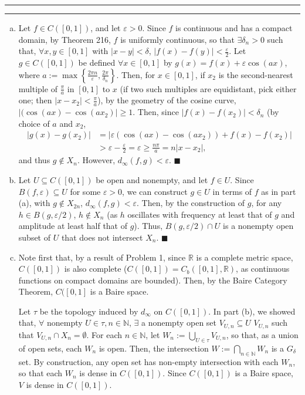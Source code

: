 \documentclass[11pt]{article}
\newcounter{questionCounter}
\newcounter{partCounter}[questionCounter]
\newenvironment{question}[2][\arabic{questionCounter}]{%
    \setcounter{partCounter}{0}%
    \vspace{.25in} \hrule \vspace{0.5em}%
        \noindent{\bf #2}%
    \vspace{0.8em} \hrule \vspace{.10in}%
    \addtocounter{questionCounter}{1}%
}{}
\renewcommand{\qed}{\quad $\blacksquare$}
\newcommand{\N}{\mathbb{N}} %
\newcommand{\R}{\mathbb{R}} %
\newcommand{\e}{\varepsilon} %
\begin{document}
\newpage
\begin{question}{Problem 3}
\begin{enumerate}[(a)]
\item Let $f \in C([0,1])$, and let $\e > 0$. Since $f$ is continuous and has a
compact domain, by Theorem 216, $f$ is uniformly continuous, so that
$\exists \delta_n > 0$ such that, $\forall x,y \in [0,1]$ with
$|x - y| < \delta$, $|f(x) - f(y)| < \frac{\e}{2}$. Let
$g \in C([0,1])$ be defined $\forall x \in [0,1]$ by
$g(x) = f(x) + \e\cos(ax)$, where
$a := \max\left\{\frac{2\pi n}{\e}, \frac{2\pi}{\delta_n}\right\}$. Then, for
$x \in [0,1]$, if $x_2$ is the second-nearest multiple of $\frac{\pi}{a}$ in
$[0,1]$ to $x$ (if two such multiples are equidistant, pick either one; then
$|x - x_2| < \frac{\pi}{a}$), by the geometry of the cosine curve,
$|(\cos(ax) - \cos(ax_2)| \geq 1$. Then, since $|f(x) - f(x_2)| < \delta_n$ (by
choice of $a$ and $x_2$,
\begin{align*}
|g(x) - g(x_2)|
 & = |\e(\cos(ax) - \cos(ax_2)) + f(x) - f(x_2)| \\
 & > \e - \frac{\e}{2}
 = \e
 \geq \frac{n\pi}{a} = n|x - x_2|, 
\end{align*}
and thus $g \notin X_n$. However, $d_{\infty}(f,g) < \e$. \qed

\item Let $U \subseteq C([0,1])$ be open and nonempty, and let $f \in U$. Since
$B(f,\e) \subseteq U$ for some $\e > 0$, we can construct $g \in U$ in terms of
$f$ as in part (a), with $g \notin X_{2n}$, $d_{\infty}(f,g) < \e$. Then, by
the construction of $g$, for any $h \in B(g,\e/2)$, $h \notin X_n$ (as $h$
oscillates with frequency at least that of $g$ and amplitude at least half that
of $g$). Thus, $B(g,\e/2) \cap U$ is a nonempty open subset of $U$ that does
not intersect $X_n$. \qed

\item Note first that, by a result of Problem 1, since $\R$ is a complete
metric space, $C([0,1])$ is also complete ($C([0,1]) = C_b([0,1],\R)$, as
continuous functions on compact domains are bounded). Then, by the Baire
Category Theorem, $C([0,1]$ is a Baire space.

Let $\tau$ be the topology induced by $d_{\infty}$ on $C([0,1])$. In part
(b), we showed that, $\forall$ nonempty $U \in \tau, n \in \N$, $\exists$ a
nonempty open set $V_{U,n} \subseteq U$ $V_{U,n}$ such that $V_{U,n} \cap X_n =
\emptyset$. For each $n \in \N$, let $W_n := \bigcup_{U \in \tau} V_{U,n}$, so
that, as a union of open sets, each $W_n$ is open. Then, the intersection
$W := \bigcap_{n \in \N} W_n$ is a $G_{\delta}$ set. By construction, any
open set has non-empty intersection with each $W_n$, so that each $W_n$ is
dense in $C([0,1])$. Since $C([0,1])$ is a Baire space, $V$ is dense in
$C([0,1])$.


\end{enumerate}
\end{question}
\end{document}
